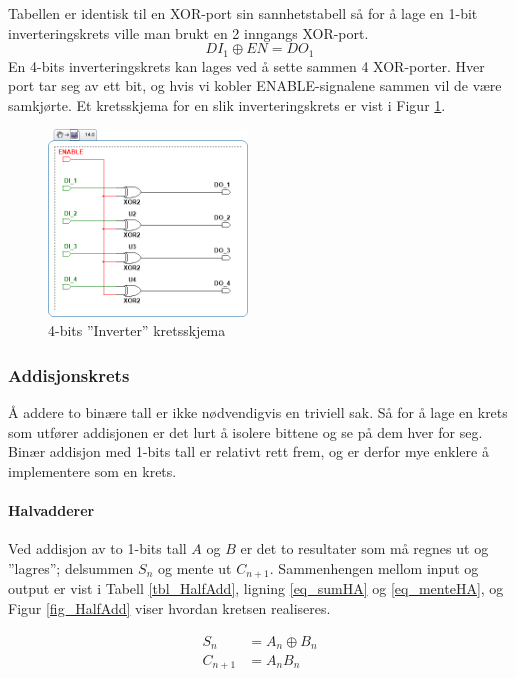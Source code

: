 \documentclass[11pt, a4paper, norwegian]{article}
\begin{document}
Tabellen er identisk til en XOR-port sin sannhetstabell så for å lage en 1-bit inverteringskrets ville man brukt en 2 inngangs XOR-port.  
$$DI_1 \oplus EN = DO_1 $$
En 4-bits inverteringskrets kan lages ved å sette sammen 4 XOR-porter. Hver port tar seg av ett bit, og hvis vi kobler ENABLE-signalene sammen vil de være samkjørte. Et kretsskjema for en slik inverteringskrets er vist i Figur \ref{fig_4bit_inverter}. 

\begin{figure}[h]
  \caption{4-bits ''Inverter'' kretsskjema}
  \centerline{\includegraphics[width=150pt]{4bit_inverter.png}}
  \label{fig_4bit_inverter}
\end{figure}

\subsubsection{Addisjonskrets}
Å addere to binære tall er ikke nødvendigvis en triviell sak. Så for å lage en krets som utfører addisjonen er det lurt å isolere bittene og se på dem hver for seg. Binær addisjon med 1-bits tall er relativt rett frem, og er derfor mye enklere å implementere som en krets.

\paragraph{Halvadderer} 
Ved addisjon av to 1-bits tall $A$ og $B$ er det to resultater som må regnes ut og ''lagres''; delsummen $S_n$ og mente ut $C_{n+1}$. Sammenhengen mellom input og output er vist i Tabell \ref{tbl_HalfAdd}, ligning \ref{eq_sumHA} og \ref{eq_menteHA}, og Figur \ref{fig_HalfAdd} viser hvordan kretsen realiseres. 

\begin{align}
  S_n &= A_n \oplus B_n \label{eq_sumHA}\\
  C_{n+1} &= A_n B_n \label{eq_menteHA}
\end{align}
\end{document}
